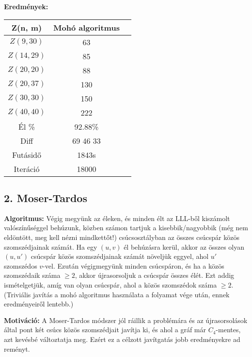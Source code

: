 \documentclass[12pt,a4paper]{article}
\begin{document}
\textbf{Eredmények:}
\begin{table}[H]
\centering
\begin{tabular}{|c|c|c|}
\hline
\textbf{Z(n, m)} & \textbf{Mohó algoritmus} \\
\hline
$Z(9,30)$  & 63 \\
$Z(14, 29)$ & 85 \\
$Z(20, 20)$ & 88 \\
$Z(20, 37)$ & 130 \\
$Z(30, 30)$ & 150 \\
$Z(40, 40)$ & 222 \\
\hline
Él \% & 92.88\% \\
\hline
Diff & 69 46 33 \\
\hline
Futásidő & 1843s \\
Iteráció & 18000 \\
\hline
\end{tabular}
\end{table}

\subsection*{2. Moser-Tardos}

\textbf{Algoritmus:} Végig megyünk az éleken, és minden élt az LLL-ből kiszámolt valószínűséggel behúzunk, közben számon tartjuk a kisebbik/nagyobbik (még nem eldöntött, meg kell nézni mindkettőt!) csúcsosztályban az összes csúcspár közös szomszédjainak számát. Ha egy $(u,v)$ él behúzásra kerül, akkor az összes olyan $(u,u')$ csúcspár közös szomszédjainak számát növeljük eggyel, ahol $u'$ szomszédos $v$-vel. Ezután végigmegyünk minden csúcspáron, és ha a közös szomszédaik száma $\geq 2$, akkor újrasorsoljuk a csúcspár összes élét. Ezt addig ismételgetjük, amíg van olyan csúcspár, ahol a közös szomszédok száma $\geq 2$. (Triviális javítás a mohó algoritmus használata a folyamat vége után, ennek eredményeiről lentebb.)

\textbf{Motiváció:} A Moser-Tardos módszer jól ráillik a problémára és az újrasorsolások által pont két csúcs közös szomszédjait javítja ki, és ahol a gráf már $C_4$-mentes, azt kevésbé változtatja meg. Ezért ez a célzott javítgatás jobb eredményekre ad reményt.
\end{document}
